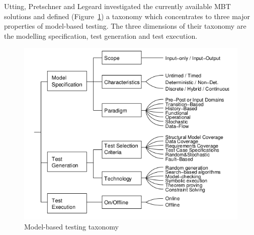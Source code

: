 \documentclass{article}
\begin{document}
Utting, Pretschner and Legeard investigated the currently available MBT solutions and defined (Figure~\ref{fig:mbttaxonomy}) a taxonomy which concentrates to three major properties of model-based testing. The three dimensions of their taxonomy are the modelling specification, test generation and test execution.

\begin{figure}[htp]
\centering
\includegraphics[scale=0.5]{img/mbt_taxonomy.png}
\caption{Model-based testing taxonomy \cite{taxonomy}}
\label{fig:mbttaxonomy}
\end{figure}
\end{document}
